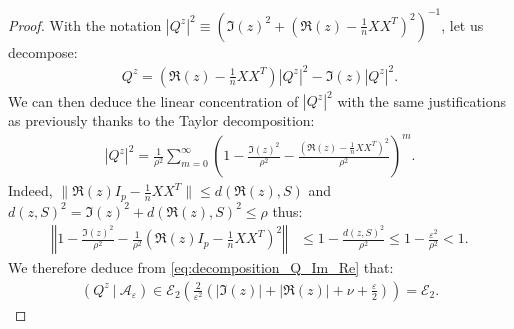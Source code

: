 \documentclass{ws-rmta}
\DeclareMathOperator{\tr}{Tr}
\begin{document}
\begin{proof}
    With the notation $|Q^z|^2 \equiv \left( \Im(z)^2 + \left( \Re(z) - \frac{1}{n}XX^T \right)^2 \right)^{-1}$, let us decompose:
    \begin{align}\label{eq:decomposition_Q_Im_Re}
      Q^z = \left( \Re(z) - \frac{1}{n}XX^T \right) |Q^z|^2 - \Im(z) |Q^z|^2.
    \end{align}
    We can then deduce the linear concentration of $|Q^z|^2$ with the same justifications as previously thanks to the Taylor decomposition:
    \begin{align*}
      |Q^z|^2 
      = \frac{1}{\rho^2} \sum_{m=0}^\infty \left( 1 - \frac{\Im(z)^2}{\rho^2} - \frac{\left( \Re(z) - \frac{1}{n}XX^T \right)^2}{\rho^2} \right)^m.
    \end{align*}
    Indeed, $\|\Re(z)I_p - \frac{1}{n}XX^T\| \leq d(\Re(z), S)$ and $d(z, S)^2 = \Im(z)^2 + d(\Re(z), S)^2 \leq \rho$ thus:
    \begin{align*}
      \left\Vert 1 - \frac{\Im(z)^2}{\rho^2}  - \frac{1}{\rho^2}\left(\Re(z)I_p - \frac{1}{n}XX^T\right) ^2\right\Vert 
      & \leq 1 -  \frac{d(z, S)^2}{\rho^2}   
      \leq 1 - \frac{\varepsilon^2}{\rho^2} <1 .
    \end{align*}
  We therefore deduce from \eqref{eq:decomposition_Q_Im_Re} that:
  \begin{align*}
    (Q^z \ | \ \mathcal A_\varepsilon) 
    \in \mathcal E_2 \left(\frac{ 2}{\varepsilon^2} \left( |\Im(z)| + |\Re(z)| + \nu + \frac{\varepsilon}{2} \right)  \right) 
    = \mathcal E_2.
  \end{align*}
\end{proof}
\end{document}
